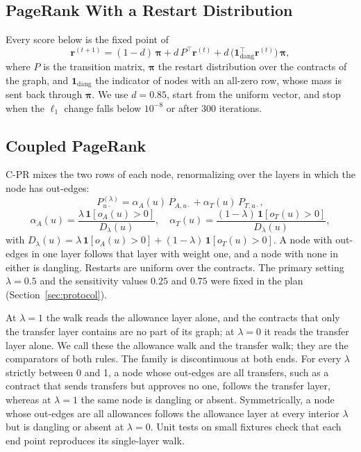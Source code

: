 \documentclass{ieeeaccess}
\newcommand{\cpr}{\mbox{C-PR}}
\begin{document}


\subsection{PageRank With a Restart Distribution}
Every score below is the fixed point of
\begin{equation}
\mathbf r^{(t+1)}=(1-d)\,\boldsymbol\pi+d\,P^{\top}\mathbf r^{(t)}+d\,\bigl(\mathbf 1_{\mathrm{dang}}^{\top}\mathbf r^{(t)}\bigr)\,\boldsymbol\pi,
\label{eq:pr}
\end{equation}
where $P$ is the transition matrix, $\boldsymbol\pi$ the restart distribution over the contracts of the graph, and $\mathbf 1_{\mathrm{dang}}$ the indicator of nodes with an all-zero row, whose mass is sent back through $\boldsymbol\pi$. We use $d=0.85$, start from the uniform vector, and stop when the $\ell_1$ change falls below $10^{-8}$ or after 300 iterations.

\subsection{Coupled PageRank}
\cpr{} mixes the two rows of each node, renormalizing over the layers in which the node has out-edges:
\begin{equation}
P^{(\lambda)}_{u\cdot}=\alpha_A(u)\,P_{A,u\cdot}+\alpha_T(u)\,P_{T,u\cdot},
\label{eq:cpr}
\end{equation}
\begin{equation}
\alpha_A(u)=\frac{\lambda\,\mathbf 1[o_A(u)>0]}{D_\lambda(u)},\quad
\alpha_T(u)=\frac{(1-\lambda)\,\mathbf 1[o_T(u)>0]}{D_\lambda(u)},
\label{eq:alpha}
\end{equation}
with $D_\lambda(u)=\lambda\,\mathbf 1[o_A(u)>0]+(1-\lambda)\,\mathbf 1[o_T(u)>0]$. A node with out-edges in one layer follows that layer with weight one, and a node with none in either is dangling. Restarts are uniform over the contracts. The primary setting $\lambda=0.5$ and the sensitivity values $0.25$ and $0.75$ were fixed in the plan (Section~\ref{sec:protocol}).

At $\lambda=1$ the walk reads the allowance layer alone, and the contracts that only the transfer layer contains are no part of its graph; at $\lambda=0$ it reads the transfer layer alone. We call these the allowance walk and the transfer walk; they are the comparators of both rules. The family is discontinuous at both ends. For every $\lambda$ strictly between 0 and 1, a node whose out-edges are all transfers, such as a contract that sends transfers but approves no one, follows the transfer layer, whereas at $\lambda=1$ the same node is dangling or absent. Symmetrically, a node whose out-edges are all allowances follows the allowance layer at every interior $\lambda$ but is dangling or absent at $\lambda=0$. Unit tests on small fixtures check that each end point reproduces its single-layer walk.
\end{document}
